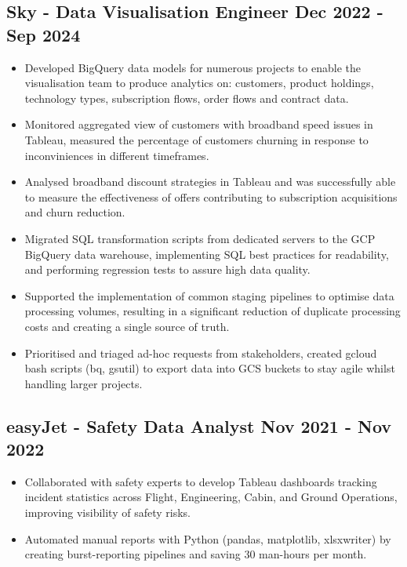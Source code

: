 \documentclass[a4paper, 10pt]{article}
\begin{document}
\subsection*{\textbf{Sky - Data Visualisation Engineer} \hfill  Dec 2022 - Sep 2024}
\begin{itemize}[noitemsep]
    \item Developed BigQuery data models for numerous projects to enable the visualisation team to produce analytics on: customers, product holdings, technology types, subscription flows, order flows and contract data.
    \item Monitored aggregated view of customers with broadband speed issues in Tableau, measured the percentage of customers churning in response to inconviniences in different timeframes.
    \item Analysed broadband discount strategies in Tableau and was successfully able to measure the effectiveness of offers contributing to subscription acquisitions and churn reduction.
    \item Migrated SQL transformation scripts from dedicated servers to the GCP BigQuery data warehouse, implementing SQL best practices for readability, and performing regression tests to assure high data quality.
    \item Supported the implementation of common staging pipelines to optimise data processing volumes, resulting in a significant reduction of duplicate processing costs and creating a single source of truth.
    \item Prioritised and triaged ad-hoc requests from stakeholders, created gcloud bash scripts (bq, gsutil) to export data into GCS buckets to stay agile whilst handling larger projects.
\end{itemize}

\subsection*{\textbf{easyJet - Safety Data Analyst} \hfill  Nov 2021 - Nov 2022}
\begin{itemize}[noitemsep]
    \item Collaborated with safety experts to develop Tableau dashboards tracking incident statistics across Flight, Engineering, Cabin, and Ground Operations, improving visibility of safety risks.
    \item Automated manual reports with Python (pandas, matplotlib, xlsxwriter) by creating burst-reporting pipelines and saving 30 man-hours per month. 
\end{itemize}
\end{document}
